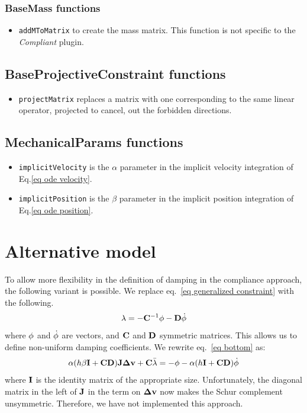 \subsubsection{BaseMass functions}
\begin{itemize}
 \item \texttt{addMToMatrix} to create the mass matrix. This function is not specific to the \textit{Compliant} plugin.
\end{itemize}

\subsection{BaseProjectiveConstraint functions}
\begin{itemize}
 \item \texttt{projectMatrix} replaces a matrix with one corresponding to the same linear operator, projected to cancel, out the forbidden directions. 
\end{itemize}

\subsection{MechanicalParams functions}
\begin{itemize}
 \item \texttt{implicitVelocity} is the $\alpha$ parameter in the implicit velocity integration of Eq.\ref{eq ode velocity}.
 \item \texttt{implicitPosition} is the $\beta$ parameter in the implicit position integration of Eq.\ref{eq ode position}.
\end{itemize}


\section{Alternative model} \label{sec alternative model}
To allow more flexibility in the definition of damping in the compliance approach, the following variant is possible.
We replace eq.~\ref{eq generalized constraint} with the following.
\begin{equation}\label{eq generalized damped constraint}
\mathbf{\lambda} = - \mathbf{C}^{-1} \phi - \mathbf{D} \dot {\phi}
\end{equation}
where $\phi$ and $\dot {\phi}$ are vectors, and $\mathbf{C}$ and $\mathbf{D}$ symmetric matrices.
This allows us to define non-uniform damping coefficients.
We rewrite eq.~\ref{eq bottom} as:
\begin{equation}
 \label{eq bottom alt}
 \alpha( h \beta \mathbf{I} + \mathbf{C} \mathbf{D}) \mathbf{J} \mathbf{\Delta v} + \mathbf{C} \bar{\mathbf{\lambda}} = -\phi - \alpha(h\mathbf{I} + \mathbf{C}\mathbf{D} )\dot {\phi}
\end{equation}
where $\mathbf{I}$ is the identity matrix of the appropriate size.
Unfortunately, the diagonal matrix in the left of $\mathbf{J}$ in the term on $\mathbf{\Delta v}$ now makes the Schur complement unsymmetric. Therefore, we have not implemented this approach.



